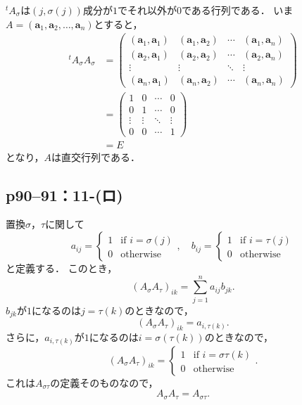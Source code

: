 \begin{tproof}
  ${}^t A_\sigma$は$(j,\sigma(j))$成分が$1$でそれ以外が$0$である行列である．
  いま$A = (\bm{a}_1,\bm{a}_2,\ldots,\bm{a}_n)$とすると，
  \begin{align*}
    {}^t A_\sigma A_\sigma & =
    \begin{pmatrix}
      (\bm{a}_1,\bm{a}_1) & (\bm{a}_1,\bm{a}_2) & \cdots & (\bm{a}_1,\bm{a}_n) \\
      (\bm{a}_2,\bm{a}_1) & (\bm{a}_2,\bm{a}_2) & \cdots & (\bm{a}_2,\bm{a}_n) \\
      \vdots              & \vdots              & \ddots & \vdots              \\
      (\bm{a}_n,\bm{a}_1) & (\bm{a}_n,\bm{a}_2) & \cdots & (\bm{a}_n,\bm{a}_n)
    \end{pmatrix}
    \\
                           & = \begin{pmatrix} 1 & 0 & \cdots & 0 \\ 0 & 1 & \cdots & 0 \\ \vdots & \vdots & \ddots & \vdots \\ 0 & 0 & \cdots & 1 \end{pmatrix} \\
                           & = E
  \end{align*}
  となり，$A$は直交行列である．
\end{tproof}

\subsection*{p90--91：11-(ロ)}

\begin{tproof}
  置換$\sigma$，$\tau$に関して
  \[
    a_{ij} =
    \begin{cases}
      1 & \text{if } i = \sigma(j) \\
      0 & \text{otherwise}
    \end{cases},
    \quad
    b_{ij}=
    \begin{cases}
      1 & \text{if } i = \tau(j) \\
      0 & \text{otherwise}
    \end{cases}
  \]
  と定義する．
  このとき，
  \[
    (A_\sigma A_\tau)_{ik} = \sum_{j=1}^n a_{ij} b_{jk}.
  \]
  $b_{jk}$が$1$になるのは$j= \tau(k)$のときなので，
  \[
    (A_\sigma A_\tau)_{ik} = a_{i, \tau(k)}.
  \]
  さらに，$a_{i, \tau(k)}$が$1$になるのは$i = \sigma(\tau(k))$のときなので，
  \[
    (A_\sigma A_\tau)_{ik} =
    \begin{cases}
      1 & \text{if } i=\sigma \tau(k) \\
      0 & \text{otherwise}
    \end{cases}.
  \]
  これは$A_{\sigma \tau}$の定義そのものなので，
  \[
    A_\sigma A_\tau = A_{\sigma \tau}.
  \]
\end{tproof}



